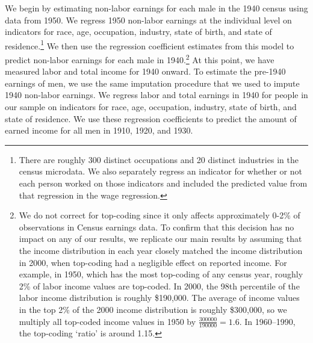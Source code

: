 \documentclass[12pt]{article}
\begin{document}
We begin by estimating non-labor earnings for each male in the 1940 census using data from 1950. 
We regress 1950 non-labor earnings at the individual level on indicators for race, age, occupation, industry, state of birth, and state of residence.\footnote{There are roughly 300 distinct occupations and 20 distinct industries in the census microdata. 
We also separately regress an indicator for whether or not each person worked on those indicators and included the predicted value from that regression in the wage regression.} 
We then use the regression coefficient estimates from this model to predict non-labor earnings for each male in 1940.\footnote{We do not correct for top-coding since it only affects approximately 0-2\% of observations in Census earnings data. 
To confirm that this decision has no impact on any of our results, we replicate our main results by assuming that the income distribution in each year closely matched the income distribution in 2000, when top-coding had a negligible effect on reported income. 
For example, in 1950, which has the most top-coding of any census year, roughly 2\% of labor income values are top-coded. 
In 2000, the 98th percentile of the labor income distribution is roughly \$190,000. 
The average of income values in the top 2\% of the 2000 income distribution is roughly \$300,000, so we multiply all top-coded income values in 1950 by $\frac{300000}{190000}=1.6$. In 1960--1990, the top-coding `ratio' is around 1.15.}
At this point, we have measured labor and total income for 1940 onward. 
To estimate the pre-1940 earnings of men, we use the same imputation procedure that we used to impute 1940 non-labor earnings. 
We regress labor and total earnings in 1940 for people in our sample on indicators for race, age, occupation, industry, state of birth, and state of residence. 
We use these regression coefficients to predict the amount of earned income for all men in 1910, 1920, and 1930.
\end{document}

